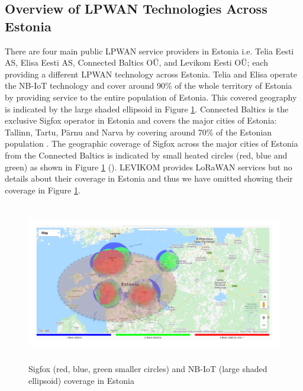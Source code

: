\documentclass[12pt]{article}
\begin{document}
\subsection{Overview of LPWAN Technologies Across Estonia} \label{Overview of LPWAN in Estonia}

There are four main public LPWAN service providers in Estonia i.e. Telia Eesti AS, Elisa Eesti AS, Connected Baltics OÜ, and Levikom Eesti OÜ; each providing a different LPWAN technology across Estonia. Telia and Elisa operate the NB-IoT technology and cover around 90\% of the whole territory of Estonia by providing service to the entire population of Estonia. This covered geography is indicated by the large shaded ellipsoid in Figure \ref{fig:Overview of coverage of NB-IoT and Sigfox in Estonia}. Connected Baltics is the exclusive Sigfox operator in Estonia and covers the major cities of Estonia: Tallinn, Tartu, Pärnu and Narva by covering around 70\% of the Estonian population \cite{connected}. The geographic coverage of Sigfox across the major cities of Estonia from the Connected Baltics is indicated by small heated circles (red, blue and green) as shown in Figure \ref{fig:Overview of coverage of NB-IoT and Sigfox in Estonia} (\cite{connected}). LEVIKOM \cite{levikom} provides LoRaWAN services but no details about their coverage in Estonia and thus we have omitted showing their coverage in Figure \ref{fig:Overview of coverage of NB-IoT and Sigfox in Estonia}. \par \begin{figure}[H]
    \centering
    \includegraphics[width=0.9\columnwidth,height=7cm, keepaspectratio]{Images/coverage.pdf}
    \caption{Sigfox (red, blue, green smaller circles) and NB-IoT (large shaded ellipsoid) coverage in Estonia}
    \label{fig:Overview of coverage of NB-IoT and Sigfox in Estonia}
\end{figure}
\end{document}
